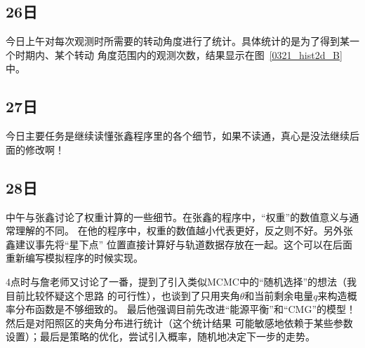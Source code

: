 \subsection{26日}
今日上午对每次观测时所需要的转动角度进行了统计。具体统计的是为了得到某一个时期内、某个转动
角度范围内的观测次数，结果显示在图~\ref{0321_hist2d_B}中。


\subsection{27日}
今日主要任务是继续读懂张鑫程序里的各个细节，如果不读通，真心是没法继续后面的修改啊！

\subsection{28日}
中午与张鑫讨论了权重计算的一些细节。在张鑫的程序中，“权重”的数值意义与通常理解的不同。
在他的程序中，权重的数值越小代表更好，反之则不好。{\heiti 另外张鑫建议事先将“星下点”
位置直接计算好与轨道数据存放在一起。这个可以在后面重新编写模拟程序的时候实现。}

4点时与詹老师又讨论了一番，提到了引入类似MCMC中的“随机选择”的想法（我目前比较怀疑这个思路
的可行性），也谈到了只用夹角$\theta$和当前剩余电量$q$来构造概率分布函数是不够细致的。
最后他强调目前先改进“能源平衡”和“CMG”的模型！然后是对阳照区的夹角分布进行统计（这个统计结果
可能敏感地依赖于某些参数设置）；最后是策略的优化，尝试引入概率，随机地决定下一步的走势。


